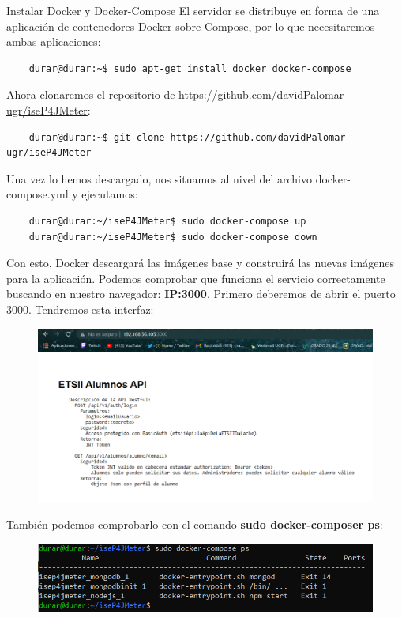 \documentclass[a4paper]{article}
\begin{document}
Instalar Docker y Docker-Compose
El servidor se distribuye en forma de  una aplicación de contenedores Docker sobre
Compose, por lo que necesitaremos ambas aplicaciones:
\begin{lstlisting}
    durar@durar:~$ sudo apt-get install docker docker-compose
\end{lstlisting}
Ahora clonaremos el repositorio de \href{https://github.com/davidPalomar-ugr/iseP4JMeter}{https://github.com/davidPalomar-ugr/iseP4JMeter}:
\begin{lstlisting}
    durar@durar:~$ git clone https://github.com/davidPalomar-ugr/iseP4JMeter
\end{lstlisting}
Una vez lo hemos descargado, nos situamos al nivel del archivo docker-compose.yml y ejecutamos:
\begin{lstlisting}
    durar@durar:~/iseP4JMeter$ sudo docker-compose up
    durar@durar:~/iseP4JMeter$ sudo docker-compose down
\end{lstlisting}
Con esto, Docker descargará las imágenes base y construirá las nuevas imágenes para
la aplicación. 
Podemos comprobar que funciona el servicio correctamente buscando en nuestro navegador:
\textbf{IP:3000}. Primero deberemos de abrir el puerto 3000. Tendremos esta interfaz: \newline
\begin{figure}[hbt!]
    \centering
    \includegraphics[width=\textwidth]{direccion docker.png}
\end{figure}
También podemos comprobarlo con el comando \textbf{sudo docker-composer ps}:
\begin{figure}[hbt!]
    \centering
    \includegraphics[width=\textwidth]{salida docker-compose ps.png}
\end{figure}
\end{document}
